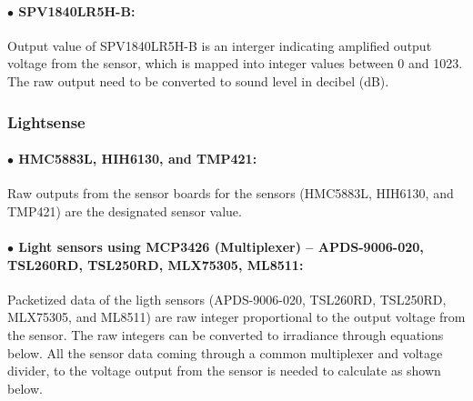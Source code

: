 \paragraph{$\bullet$ SPV1840LR5H-B:}

Output value of SPV1840LR5H-B is an interger indicating amplified output voltage from the sensor, which is mapped into integer values between 0 and 1023.
The raw output need to be converted to sound level in decibel (dB).




\bigbreak
\subsubsection{Lightsense}

\paragraph{$\bullet$ HMC5883L, HIH6130, and TMP421:}
Raw outputs from the sensor boards for the sensors (HMC5883L, HIH6130, and TMP421) are the designated sensor value.

\paragraph{$\bullet$ Light sensors using MCP3426 (Multiplexer) -- APDS-9006-020, TSL260RD, TSL250RD, MLX75305, ML8511:}
Packetized data of the ligth sensors (APDS-9006-020, TSL260RD, TSL250RD, MLX75305, and ML8511) are raw integer proportional to the output voltage from the sensor.  The raw integers can be converted to irradiance through equations below. 
\newline \newline
All the sensor data coming through a common multiplexer and voltage divider, to the voltage output from the sensor is needed to calculate as shown below.

